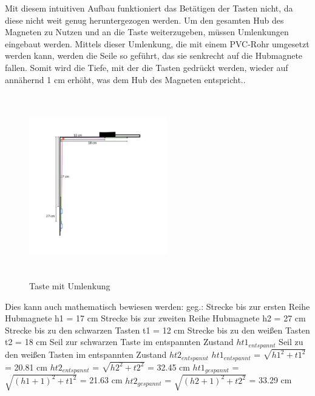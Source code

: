 Mit diesem intuitiven Aufbau funktioniert das Betätigen der Tasten nicht, da diese nicht weit genug heruntergezogen werden.
Um den gesamten Hub des Magneten zu Nutzen und an die Taste weiterzugeben, müssen Umlenkungen eingebaut werden.
Mittels dieser Umlenkung, die mit einem PVC-Rohr umgesetzt werden kann, werden die Seile so geführt, das sie senkrecht auf die Hubmagnete fallen.
Somit wird die Tiefe, mit der die Tasten gedrückt werden, wieder auf annähernd 1 cm erhöht, was dem Hub des Magneten entspricht..

\begin{figure}[htbp]
    \centering
    \includegraphics[width=6cm, height=8cm]{img/mitUmlenkung_locker}
    \caption{Taste mit Umlenkung}
\end{figure}


Dies kann auch mathematisch bewiesen werden:
\newline geg.: %
\newline Strecke bis zur ersten Reihe Hubmagnete h1 = 17 cm %
\newline Strecke bis zur zweiten Reihe Hubmagnete h2 = 27 cm
\newline Strecke bis zu den schwarzen Tasten t1 = 12 cm
\newline Strecke bis zu den weißen Tasten t2 = 18 cm
\newline Seil zur schwarzen Taste im entspannten Zustand $ht1_{entspannt}$ %
\newline Seil zu den weißen Tasten im entspannten Zustand $ht2_{entspannt}$
\newline $ht1_{entspannt}$ = $\sqrt {h1^{2} + t1^{2}}$ = 20.81 cm
\newline $ht2_{entspannt}$ = $\sqrt {h2^{2} + t2^{2}}$ = 32.45 cm
\newline $ht1_{gespannt}$ = $\sqrt {(h1 + 1) ^{2} + t1^{2}}$ = 21.63 cm
\newline $ht2_{gespannt}$ = $\sqrt {(h2 + 1)^{2} + t2^{2}}$ = 33.29 cm

